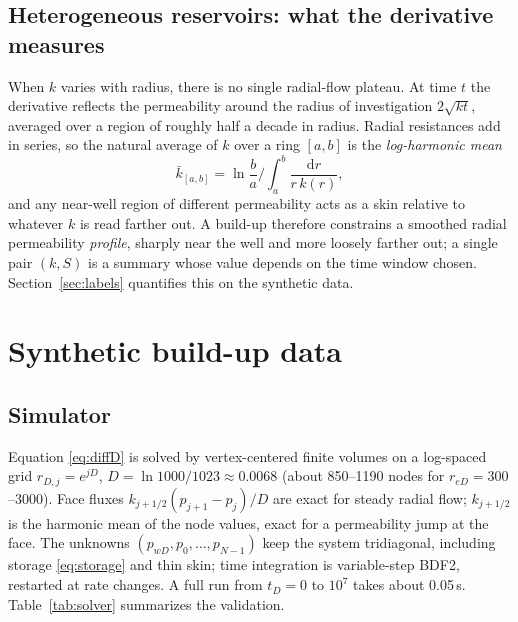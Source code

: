 \documentclass[11pt]{article}
\newcommand{\dd}{\mathrm{d}}
\newcommand{\reD}{r_{eD}}
\begin{document}
\subsection{Heterogeneous reservoirs: what the derivative measures}
\label{sec:hetero}

When $k$ varies with radius, there is no single radial-flow plateau. At time $t$ the derivative reflects the
permeability around the radius of investigation $2\sqrt{k t}$, averaged over a region of roughly half a decade in
radius. Radial resistances add in series, so the natural average of $k$ over a ring $[a, b]$ is the
\emph{log-harmonic mean}
\begin{equation}
  \bar k_{[a,b]} = \ln\frac{b}{a} \bigg/ \int_a^b \frac{\dd r}{r\,k(r)} ,
  \label{eq:ringmean}
\end{equation}
and any near-well region of different permeability acts as a skin relative to whatever $k$ is read farther out.
A build-up therefore constrains a smoothed radial permeability \emph{profile}, sharply near the well and more
loosely farther out; a single pair $(k, S)$ is a summary whose value depends on the time window chosen.
Section~\ref{sec:labels} quantifies this on the synthetic data.

\section{Synthetic build-up data}
\label{sec:data}

\subsection{Simulator}
\label{sec:solver}

Equation \eqref{eq:diffD} is solved by vertex-centered finite volumes on a log-spaced grid
$r_{D,j} = e^{jD}$, $D = \ln 1000/1023 \approx 0.0068$ (about 850--1190 nodes for $\reD = 300$--$3000$). Face
fluxes $k_{j+1/2}(p_{j+1}-p_j)/D$ are exact for steady radial flow; $k_{j+1/2}$ is the harmonic mean of the node
values, exact for a permeability jump at the face. The unknowns $(p_{wD}, p_0, \dots, p_{N-1})$ keep the system
tridiagonal, including storage \eqref{eq:storage} and thin skin; time integration is variable-step BDF2, restarted
at rate changes. A full run from $t_D = 0$ to $10^7$ takes about 0.05\,s. Table~\ref{tab:solver} summarizes the
validation.
\end{document}
